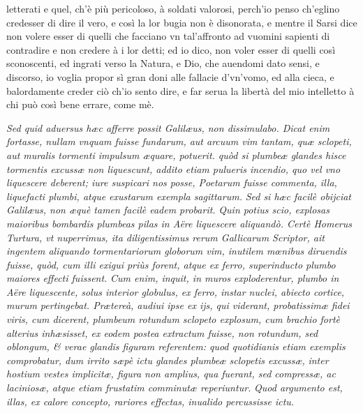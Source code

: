 \documentclass[11pt,twoside,openany]{book}
\begin{document}
letterati e quel, ch'è più pericoloso, à soldati valorosi, perch'io penso ch'eglino credesser di dire il vero, e così la lor bugia non è disonorata, e mentre il Sarsi dice non volere esser di quelli che facciano vn tal'affronto ad vuomini sapienti di contradire e non credere à i lor detti; ed io dico, non voler esser di quelli così sconoscenti, ed ingrati verso la Natura, e Dio, che auendomi dato sensi, e discorso, io voglia propor sì gran doni alle fallacie d'vn'vomo, ed alla cieca, e balordamente creder ciò ch'io sento dire, e far serua la libertà del mio intelletto à chi può così bene errare, come mè.



\par\bigskip\noindent{}\enspace \textit{Sed quid aduersus hæc afferre possit Galilæus, non dissimulabo. Dicat enim fortasse, nullam vnquam fuisse fundarum, aut arcuum vim tantam, quæ sclopeti, aut muralis tormenti impulsum æquare, potuerit. quòd si plumbeæ glandes hisce tormentis excussæ non liquescunt, addito etiam pulueris incendio, quo vel vno liquescere deberent; iure suspicari nos posse, Poetarum fuisse commenta, illa, liquefacti plumbi, atque exustarum exempla sagittarum. }\textit{Sed si hæc facilè obijciat Galilæus, non æquè tamen facilè eadem probarit. }\textit{Quin potius scio, explosas maioribus bombardis plumbeas pilas in Aëre liquescere aliquandò. Certè Homerus Turtura, vt nuperrimus, ita diligentissimus rerum Gallicarum Scriptor, ait ingentem aliquando tormentariorum globorum vim, inutilem mœnibus diruendis fuisse, quòd, cum illi exigui priùs forent, atque ex ferro, superinducto plumbo maiores effecti fuissent. }\textit{Cum enim, inquit, in muros exploderentur, plumbo in Aëre liquescente, solus interior globulus, ex ferro, instar nuclei, abiecto cortice, murum pertingebat. Prætereà, audiui ipse ex ijs, qui viderant, probatissimæ fidei viris, cum dicerent, plumbeum rotundum sclopeto explosum, cum brachio fortè alterius inhæsisset, ex eodem postea extractum fuisse, non rotundum, sed oblongum, \& verae glandis figuram referentem: quod quotidianis etiam exemplis comprobatur, dum irrito sæpè ictu glandes plumbeæ sclopetis excussæ, }\textit{inter hostium vestes implicitæ, figura non amplius, qua fuerant, sed compressæ, ac laciniosæ, atque etiam frustatim comminutæ reperiuntur. }\textit{Quod argumento est, illas, ex calore concepto, rariores effectas, inualido percussisse ictu.}
\end{document}
